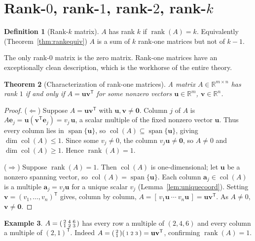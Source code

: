 \documentclass[11pt,oneside]{book}
\theoremstyle{plain}
\newtheorem{theorem}{Theorem}[chapter]
\theoremstyle{definition}
\newtheorem{definition}[theorem]{Definition}
\newtheorem{example}[theorem]{Example}
\theoremstyle{remark}
\newcommand{\R}{\mathbb{R}}
\newcommand{\rank}{\operatorname{rank}}
\newcommand{\col}{\operatorname{col}}
\newcommand{\spn}{\operatorname{span}}
\newcommand{\dimm}{\operatorname{dim}}
\newcommand{\T}{^{\mathsf T}}
\newcommand{\bu}{\mathbf{u}}
\newcommand{\bv}{\mathbf{v}}
\newcommand{\ba}{\mathbf{a}}
\newcommand{\be}{\mathbf{e}}
\newcommand{\bzero}{\mathbf{0}}
\begin{document}
\section{Rank-$0$, rank-$1$, rank-$2$, rank-$k$}

\begin{definition}[Rank-$k$ matrix]
$A$ has rank $k$ if $\rank(A)=k$. Equivalently (Theorem~\ref{thm:rankequiv}) $A$ is a
sum of $k$ rank-one matrices but not of $k-1$.
\end{definition}

The only rank-$0$ matrix is the zero matrix. Rank-one matrices have an exceptionally
clean description, which is the workhorse of the entire theory.

\begin{theorem}[Characterization of rank-one matrices]\label{thm:rank1}
A matrix $A\in\R^{m\times n}$ has rank $1$ if and only if $A=\bu\bv\T$ for some nonzero
vectors $\bu\in\R^m$, $\bv\in\R^n$.
\end{theorem}
\begin{proof}
($\Leftarrow$) Suppose $A=\bu\bv\T$ with $\bu,\bv\ne\bzero$. Column $j$ of $A$ is
$A\be_j=\bu(\bv\T\be_j)=v_j\,\bu$, a scalar multiple of the fixed nonzero vector $\bu$.
Thus every column lies in $\spn\{\bu\}$, so $\col(A)\subseteq\spn\{\bu\}$, giving
$\dimm\col(A)\le 1$. Since some $v_j\ne 0$, the column $v_j\bu\ne\bzero$, so $A\ne 0$ and
$\dimm\col(A)\ge 1$. Hence $\rank(A)=1$.

($\Rightarrow$) Suppose $\rank(A)=1$. Then $\col(A)$ is one-dimensional; let $\bu$ be a
nonzero spanning vector, so $\col(A)=\spn\{\bu\}$. Each column $\ba_j\in\col(A)$ is a
multiple $\ba_j=v_j\bu$ for a unique scalar $v_j$ (Lemma~\ref{lem:uniquecoord}). Setting
$\bv=(v_1,\dots,v_n)\T$ gives, column by column, $A=[\,v_1\bu\ \cdots\ v_n\bu\,]
=\bu\bv\T$. As $A\ne 0$, $\bv\ne\bzero$.
\end{proof}

\begin{example}
$A=\begin{psmallmatrix}2&4&6\\1&2&3\end{psmallmatrix}$ has every row a multiple of
$(2,4,6)$ and every column a multiple of $(2,1)\T$. Indeed
$A=\begin{psmallmatrix}2\\1\end{psmallmatrix}\begin{psmallmatrix}1&2&3\end{psmallmatrix}
=\bu\bv\T$, confirming $\rank(A)=1$.
\end{example}
\end{document}
